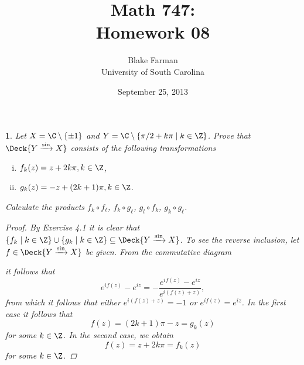 \documentclass[10pt]{amsart}
\author{Blake Farman\\University of South Carolina}
\title{Math 747:\\Homework 08}
\date{September 25, 2013}
\begin{document}
\maketitle

\providecommand{\p}{\mathfrak{p}}
\providecommand{\m}{\mathfrak{m}}

\newtheorem{thm}{}
\newtheorem{lem}{Lemma}
\newtheorem{prop}{Proposition}
\theoremstyle{definition}
\newtheorem{defn}{Definition}[thm]

\newcommand{\A}{\mathbb{A}}

\begin{thm}
  Let $X = \C \setminus \{\pm 1\}$ and $Y = \C \setminus \left\{\pi/2 + k\pi  \;\middle\vert\; k \in \Z \right\}$.
  Prove that $\Deck{Y \xrightarrow{\sin} X}$ consists of the following transformations
  \begin{enumerate}[(i)]
  \item
    $f_k(z) = z + 2k\pi, k \in \Z$,
  \item
    $g_k(z) = -z + (2k + 1)\pi, k \in \Z$.
  \end{enumerate}
  Calculate the products $f_k \circ f_\ell$, $f_k \circ g_\ell$, $g_l \circ f_k$, $g_k \circ g_\ell$.

  \begin{proof}
    By Exercise 4.1 it is clear that $\left\{f_k \;\middle\vert\; k \in \Z \right\} \cup \left\{g_k \;\middle\vert\; k \in \Z \right\} \subseteq \Deck{Y \xrightarrow{\sin} X}$.
    To see the reverse inclusion, let $f \in \Deck{Y \xrightarrow{\sin} X}$ be given.
    From the commutative diagram
    \begin{center}
    \end{center}
    it follows that
    $$e^{if(z)} - e^{iz} = -\frac{e^{if(z)} - e^{iz}}{e^{i(f(z) + z)}},$$
    from which it follows that either $e^{i(f(z) + z)} = -1$ or $e^{if(z)} = e^{iz}$.
    In the first case it follows that
    $$f(z) = (2k + 1)\pi - z = g_k(z)$$
    for some $k \in \Z$.
    In the second case, we obtain 
    $$f(z) = z + 2k\pi = f_k(z)$$
    for some $k \in \Z$.
  \end{proof}
\end{thm}
\end{document}
